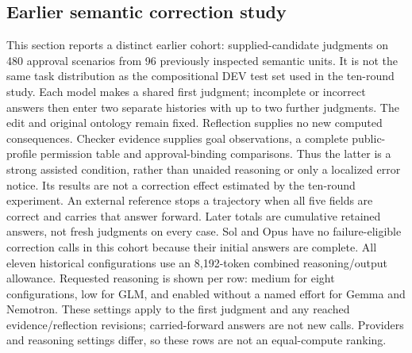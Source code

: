 \documentclass[a4paper,preprint,12pt,numbers,nopreprintline]{elsarticle}
\begin{document}
\subsection{Earlier semantic correction study}
This section reports a distinct earlier cohort: supplied-candidate judgments on 480 approval scenarios from 96 previously inspected semantic units. It is not the same task distribution as the compositional DEV test set used in the ten-round study. Each model makes a shared first judgment; incomplete or incorrect answers then enter two separate histories with up to two further judgments. The edit and original ontology remain fixed. Reflection supplies no new computed consequences. Checker evidence supplies goal observations, a complete public-profile permission table and approval-binding comparisons. Thus the latter is a strong assisted condition, rather than unaided reasoning or only a localized error notice. Its results are not a correction effect estimated by the ten-round experiment.
An external reference stops a trajectory when all five fields are correct and carries that answer forward. Later totals are cumulative retained answers, not fresh judgments on every case. Sol and Opus have no failure-eligible correction calls in this cohort because their initial answers are complete. All eleven historical configurations use an 8,192-token combined reasoning/output allowance. Requested reasoning is shown per row: medium for eight configurations, low for GLM, and enabled without a named effort for Gemma and Nemotron. These settings apply to the first judgment and any reached evidence/reflection revisions; carried-forward answers are not new calls. Providers and reasoning settings differ, so these rows are not an equal-compute ranking.
\end{document}
